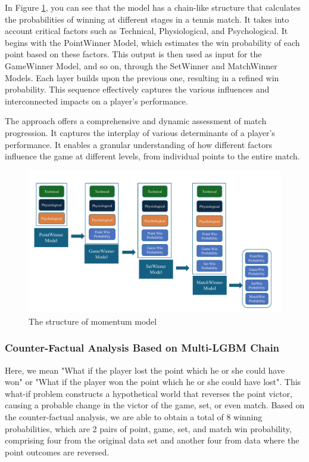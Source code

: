 \documentclass{mcmthesis}
\begin{document}
In Figure \ref{fig: model}, you can see that the model has a chain-like structure that calculates the probabilities of winning at different stages in a tennis match. It takes into account critical factors such as Technical, Physiological, and Psychological. It begins with the PointWinner Model, which estimates the win probability of each point based on these factors. This output is then used as input for the GameWinner Model, and so on, through the SetWinner and MatchWinner Models. Each layer builds upon the previous one, resulting in a refined win probability. This sequence effectively captures the various influences and interconnected impacts on a player's performance.

The approach offers a comprehensive and dynamic assessment of match progression. It captures the interplay of various determinants of a player's performance. It enables a granular understanding of how different factors influence the game at different levels, from individual points to the entire match.

\begin{figure}[ht]
    \centering
    \begin{minipage}{\textwidth}
        \centering
        \includegraphics[width=\textwidth]{figures/flow.pdf} 
        \caption{The structure of momentum model}
        \label{fig: model}
    \end{minipage}\hfill
\end{figure}

\subsubsection{Counter-Factual Analysis Based on Multi-LGBM Chain}
Here, we mean "What if the player lost the point which he or she could have won" or "What if the player won the point which he or she could have lost". This what-if problem constructs a hypothetical world that reverses the point victor, causing a probable change in the victor of the game, set, or even match. Based on the counter-factual analysis, we are able to obtain a total of 8 winning probabilities, which are 2 pairs of point, game, set, and match win probability, comprising four from the original data set and another four from data where the point outcomes are reversed.
\end{document}
